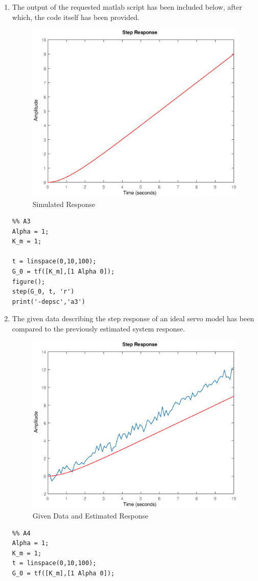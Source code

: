\documentclass[11pt,a4paper]{article}
\begin{document}
\begin{enumerate}
    
    \pagebreak
	\item The output of the requested matlab script has been included below, after which, the code itself has been provided. 
    \begin{figure}[H]
	\centering
	\includegraphics[width=.8\textwidth]{PreLach/a3.eps}
	\caption{\label{fig:simrep} Simulated Response}
	\end{figure}
    \begin{lstlisting}
%% A3
Alpha = 1;
K_m = 1;

t = linspace(0,10,100);
G_0 = tf([K_m],[1 Alpha 0]);
figure();
step(G_0, t, 'r')
print('-depsc','a3')
	\end{lstlisting}
    
    
    
    
    \pagebreak
	\item The given data describing the step response of an ideal servo model has been compared to the previously estimated system response. 
    \begin{figure}[H]
	\centering
	\includegraphics[width=.8\textwidth]{PreLach/a4.eps}
	\caption{\label{fig:datacomp}Given Data and Estimated Response}
	\end{figure}
    \begin{lstlisting}
%% A4    
Alpha = 1;
K_m = 1;
t = linspace(0,10,100);
G_0 = tf([K_m],[1 Alpha 0]);
    

\end{lstlisting}
\end{enumerate}
\end{document}
